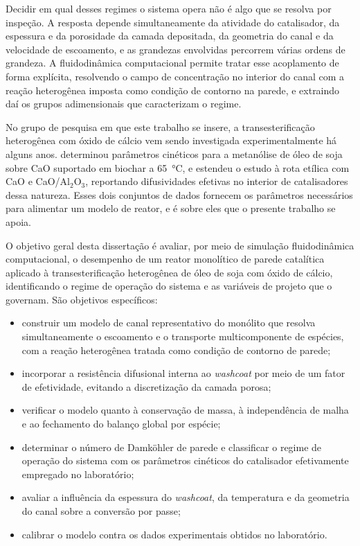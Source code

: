 Decidir em qual desses regimes o sistema opera não é algo que se resolva por
inspeção. A resposta depende simultaneamente da atividade do catalisador, da
espessura e da porosidade da camada depositada, da geometria do canal e da
velocidade de escoamento, e as grandezas envolvidas percorrem várias ordens de
grandeza. A fluidodinâmica computacional permite tratar esse acoplamento de
forma explícita, resolvendo o campo de concentração no interior do canal com a
reação heterogênea imposta como condição de contorno na parede, e extraindo daí
os grupos adimensionais que caracterizam o regime.

No grupo de pesquisa em que este trabalho se insere, a transesterificação
heterogênea com óxido de cálcio vem sendo investigada experimentalmente há
alguns anos. \textcite{Melo2023} determinou parâmetros cinéticos para a
metanólise de óleo de soja sobre CaO suportado em biochar a \SI{65}{\celsius},
e \textcite{Fonseca2026} estendeu o estudo à rota etílica com CaO e
CaO/Al$_2$O$_3$, reportando difusividades efetivas no interior de catalisadores
dessa natureza. Esses dois conjuntos de dados fornecem os parâmetros necessários
para alimentar um modelo de reator, e é sobre eles que o presente trabalho se
apoia.

O objetivo geral desta dissertação é avaliar, por meio de simulação
fluidodinâmica computacional, o desempenho de um reator monolítico de parede
catalítica aplicado à transesterificação heterogênea de óleo de soja com óxido
de cálcio, identificando o regime de operação do sistema e as variáveis de
projeto que o governam. São objetivos específicos:

\begin{itemize}
\itemsep2pt
\item construir um modelo de canal representativo do monólito que resolva
      simultaneamente o escoamento e o transporte multicomponente de espécies,
      com a reação heterogênea tratada como condição de contorno de parede;
\item incorporar a resistência difusional interna ao \textit{washcoat} por meio
      de um fator de efetividade, evitando a discretização da camada porosa;
\item verificar o modelo quanto à conservação de massa, à independência de
      malha e ao fechamento do balanço global por espécie;
\item determinar o número de Damköhler de parede e classificar o regime de
      operação do sistema com os parâmetros cinéticos do catalisador
      efetivamente empregado no laboratório;
\item avaliar a influência da espessura do \textit{washcoat}, da temperatura e
      da geometria do canal sobre a conversão por passe;
\item calibrar o modelo contra os dados experimentais obtidos no laboratório.
\end{itemize}

